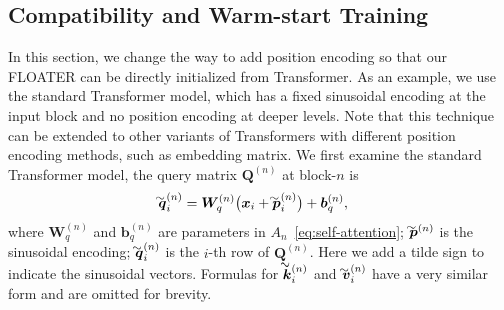 \documentclass[11pt]{article}
\newcommand\wtil[1]{\ThisStyle{\setbox0=\hbox{$\SavedStyle#1$}\stackengine{-.1\LMpt}{$\SavedStyle#1$}{\stretchto{\scaleto{\SavedStyle\mkern.2mu\sim}{.5467\wd0}}{.7\ht0}
  }{O}{c}{F}{T}{S}}}
\def\vb{{\bm{b}}}
\def\vk{{\bm{k}}}
\def\vp{{\bm{p}}}
\def\vq{{\bm{q}}}
\def\vv{{\bm{v}}}
\def\vx{{\bm{x}}}
\def\mQ{{\bm{Q}}}
\def\mW{{\bm{W}}}
\begin{document}
\subsection{Compatibility and Warm-start Training\label{sec:compatible}}
In this section, we change the way to add position encoding so that our FLOATER can be directly initialized from Transformer. As an example, we use the standard Transformer model, which has a fixed sinusoidal encoding at the input block and no position encoding at deeper levels. Note that this technique can be extended to other variants of Transformers with different position encoding methods, such as embedding matrix. We first examine the standard Transformer model, the query matrix $\mQ^{(n)}$ at block-$n$ is
\begin{align}
\wtil{\vq}_i^{(n)}&=\mW_{q}^{(n)}\big(\vx_i+\wtil{\vp}^{(n)}_i\big)+\vb_{q}^{(n)},\label{subeq:transformer-n1}
\end{align}
where $\mW^{(n)}_q$ and $\vb^{(n)}_q$ are parameters in $A_n$~\eqref{eq:self-attention}; $\wtil{\vp}^{(n)}$ is the sinusoidal encoding; $\wtil{\vq}_i^{(n)}$ is the $i$-th row of $\mQ^{(n)}$. Here we add a tilde sign to indicate the sinusoidal vectors. Formulas for $\wtil{\vk}_i^{(n)}$ and $\wtil{\vv}_i^{(n)}$ have a very similar form and are omitted for brevity.
\end{document}
